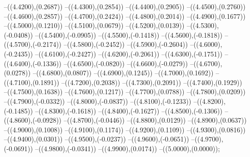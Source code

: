 {	--({\sx*(4.4200)},{\sy*(0.2687)})
	--({\sx*(4.4300)},{\sy*(0.2854)})
	--({\sx*(4.4400)},{\sy*(0.2905)})
	--({\sx*(4.4500)},{\sy*(0.2760)})
	--({\sx*(4.4600)},{\sy*(0.2857)})
	--({\sx*(4.4700)},{\sy*(0.2424)})
	--({\sx*(4.4800)},{\sy*(0.2014)})
	--({\sx*(4.4900)},{\sy*(0.1677)})
	--({\sx*(4.5000)},{\sy*(0.1210)})
	--({\sx*(4.5100)},{\sy*(0.0679)})
	--({\sx*(4.5200)},{\sy*(0.0139)})
	--({\sx*(4.5300)},{\sy*(-0.0408)})
	--({\sx*(4.5400)},{\sy*(-0.0905)})
	--({\sx*(4.5500)},{\sy*(-0.1418)})
	--({\sx*(4.5600)},{\sy*(-0.1818)})
	--({\sx*(4.5700)},{\sy*(-0.2174)})
	--({\sx*(4.5800)},{\sy*(-0.2452)})
	--({\sx*(4.5900)},{\sy*(-0.2604)})
	--({\sx*(4.6000)},{\sy*(-0.2435)})
	--({\sx*(4.6100)},{\sy*(-0.2427)})
	--({\sx*(4.6200)},{\sy*(-0.2061)})
	--({\sx*(4.6300)},{\sy*(-0.1751)})
	--({\sx*(4.6400)},{\sy*(-0.1336)})
	--({\sx*(4.6500)},{\sy*(-0.0820)})
	--({\sx*(4.6600)},{\sy*(-0.0279)})
	--({\sx*(4.6700)},{\sy*(0.0278)})
	--({\sx*(4.6800)},{\sy*(0.0807)})
	--({\sx*(4.6900)},{\sy*(0.1245)})
	--({\sx*(4.7000)},{\sy*(0.1692)})
	--({\sx*(4.7100)},{\sy*(0.1891)})
	--({\sx*(4.7200)},{\sy*(0.2038)})
	--({\sx*(4.7300)},{\sy*(0.2091)})
	--({\sx*(4.7400)},{\sy*(0.1929)})
	--({\sx*(4.7500)},{\sy*(0.1638)})
	--({\sx*(4.7600)},{\sy*(0.1217)})
	--({\sx*(4.7700)},{\sy*(0.0788)})
	--({\sx*(4.7800)},{\sy*(0.0209)})
	--({\sx*(4.7900)},{\sy*(-0.0332)})
	--({\sx*(4.8000)},{\sy*(-0.0837)})
	--({\sx*(4.8100)},{\sy*(-0.1233)})
	--({\sx*(4.8200)},{\sy*(-0.1485)})
	--({\sx*(4.8300)},{\sy*(-0.1618)})
	--({\sx*(4.8400)},{\sy*(-0.1627)})
	--({\sx*(4.8500)},{\sy*(-0.1306)})
	--({\sx*(4.8600)},{\sy*(-0.0928)})
	--({\sx*(4.8700)},{\sy*(-0.0446)})
	--({\sx*(4.8800)},{\sy*(0.0129)})
	--({\sx*(4.8900)},{\sy*(0.0637)})
	--({\sx*(4.9000)},{\sy*(0.1008)})
	--({\sx*(4.9100)},{\sy*(0.1174)})
	--({\sx*(4.9200)},{\sy*(0.1109)})
	--({\sx*(4.9300)},{\sy*(0.0816)})
	--({\sx*(4.9400)},{\sy*(0.0301)})
	--({\sx*(4.9500)},{\sy*(-0.0237)})
	--({\sx*(4.9600)},{\sy*(-0.0651)})
	--({\sx*(4.9700)},{\sy*(-0.0691)})
	--({\sx*(4.9800)},{\sy*(-0.0341)})
	--({\sx*(4.9900)},{\sy*(0.0174)})
	--({\sx*(5.0000)},{\sy*(0.0000)});
}
